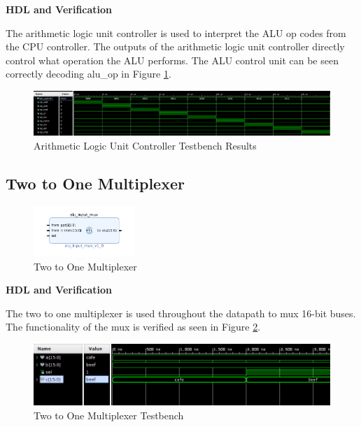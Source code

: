 \documentclass{article}
\newcommand{\stitle}{HDL and Verification}
\begin{document}
\begin{par}
	\textbf{\stitle}
	\begin{par}
		The arithmetic logic unit controller is used to interpret the ALU op codes from the CPU controller. The outputs of the arithmetic logic unit controller directly control what operation the ALU performs. The ALU control unit can be seen correctly decoding alu\_op in Figure \ref{fig:aluCtrlfig}.
	\end{par}


	\begin{figure}[H]
		\centering
		\includegraphics[width=7in]{img/alu_ctrl_tb.png}
		\caption{Arithmetic Logic Unit Controller Testbench Results}
		\label{fig:aluCtrlfig}
	\end{figure}

	\newpage
	
	\subsection{Two to One Multiplexer}
	
	\begin{figure}[H]
		\centering
		\includegraphics[width=1.5in]{img/aluMux.png}
		\caption{Two to One Multiplexer}
	\end{figure}
	
	\textbf{\stitle}
	\begin{par}
		The two to one multiplexer is used throughout the datapath to mux 16-bit buses. The functionality of the mux is verified as seen in Figure \ref{fig:muxtb}.
	\end{par}


	\begin{figure}[H]
		\centering
		\includegraphics[width=7in]{img/2to1muxtb.png}
		\caption{Two to One Multiplexer Testbench}
		\label{fig:muxtb}
	\end{figure}
	

\end{par}
\end{document}
